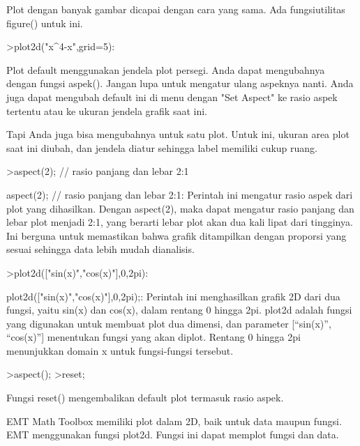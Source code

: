 \documentclass{article}
\begin{document}
\begin{eulernotebook}
\begin{eulercomment}
Plot dengan banyak gambar dicapai dengan cara yang sama. Ada
fungsiutilitas figure() untuk ini.

\end{eulercomment}
\begin{eulerprompt}
>plot2d("x^4-x",grid=5):
\end{eulerprompt}
\begin{eulercomment}
\end{eulercomment}
\begin{eulercomment}
Plot default menggunakan jendela plot persegi. Anda dapat mengubahnya
dengan fungsi aspek(). Jangan lupa untuk mengatur ulang aspeknya
nanti. Anda juga dapat mengubah default ini di menu dengan "Set
Aspect" ke rasio aspek tertentu atau ke ukuran jendela grafik saat
ini.

Tapi Anda juga bisa mengubahnya untuk satu plot. Untuk ini, ukuran
area plot saat ini diubah, dan jendela diatur sehingga label memiliki
cukup ruang.
\end{eulercomment}
\begin{eulerprompt}
>aspect(2); // rasio panjang dan lebar 2:1
\end{eulerprompt}
\begin{eulercomment}
aspect(2); // rasio panjang dan lebar 2:1: Perintah ini mengatur rasio
aspek dari plot yang dihasilkan. Dengan aspect(2), maka dapat mengatur
rasio panjang dan lebar plot menjadi 2:1, yang berarti lebar plot akan
dua kali lipat dari tingginya. Ini berguna untuk memastikan bahwa
grafik ditampilkan dengan proporsi yang sesuai sehingga data lebih
mudah dianalisis.
\end{eulercomment}
\begin{eulerprompt}
>plot2d(["sin(x)","cos(x)"],0,2pi):
\end{eulerprompt}
\begin{eulercomment}
plot2d(["sin(x)","cos(x)"],0,2pi);: Perintah ini menghasilkan grafik
2D dari dua fungsi, yaitu sin(x) dan cos(x), dalam rentang 0 hingga
2pi. plot2d adalah fungsi yang digunakan untuk membuat plot dua
dimensi, dan parameter [“sin(x)”, “cos(x)”] menentukan fungsi yang
akan diplot. Rentang 0 hingga 2pi menunjukkan domain x untuk
fungsi-fungsi tersebut.
\end{eulercomment}
\begin{eulerprompt}
>aspect();
>reset;
\end{eulerprompt}
\begin{eulercomment}
Fungsi reset() mengembalikan default plot termasuk rasio aspek.\\
\begin{eulercomment}
\begin{eulercomment}
EMT Math Toolbox memiliki plot dalam 2D, baik untuk data maupun
fungsi. EMT menggunakan fungsi plot2d. Fungsi ini dapat memplot fungsi
dan data.


\end{eulercomment}
\end{eulercomment}
\end{eulercomment}
\end{eulernotebook}
\end{document}
